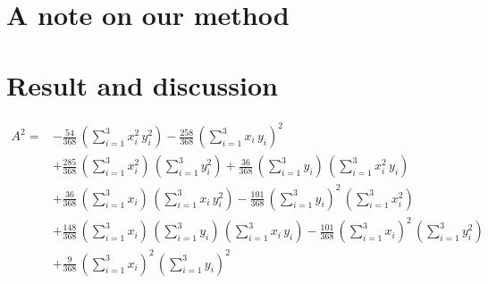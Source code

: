 \documentclass[12pt]{article}
\begin{document}
\section{A note on our method}

\section{Result and discussion}

\begin{align}
A^2 = &
-\frac{ 54}{368}\,(\sum_{i=1}^3 x_i^2\,y_i^2) 
-\frac{258}{368}\,(\sum_{i=1}^3 x_i\,y_i)^2 \nonumber \\ &
+\frac{285}{368}\,(\sum_{i=1}^3 x_i^2)\,(\sum_{i=1}^3 y_i^2) 
+\frac{ 36}{368}\,(\sum_{i=1}^3 y_i)\,(\sum_{i=1}^3 x_i^2\,y_i) \nonumber \\ &
+\frac{ 36}{368}\,(\sum_{i=1}^3 x_i)\,(\sum_{i=1}^3 x_i\,y_i^2) 
-\frac{101}{368}\,(\sum_{i=1}^3 y_i)^2\,(\sum_{i=1}^3 x_i^2) \nonumber \\ &
+\frac{148}{368}\,(\sum_{i=1}^3 x_i)\,(\sum_{i=1}^3 y_i)\,(\sum_{i=1}^3 x_i\,y_i) 
-\frac{101}{368}\,(\sum_{i=1}^3 x_i)^2\,(\sum_{i=1}^3 y_i^2) \nonumber \\ &
+\frac{  9}{368}\,(\sum_{i=1}^3 x_i)^2\,(\sum_{i=1}^3 y_i)^2 
\end{align}
\end{document}
